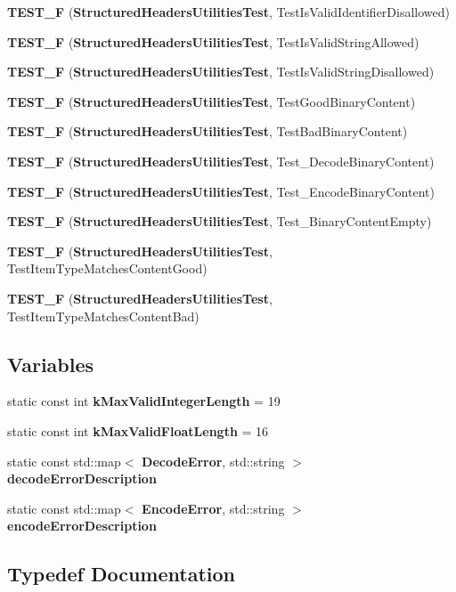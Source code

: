 \begin{DoxyCompactItemize}
\item 
{\bf T\+E\+S\+T\+\_\+F} ({\bf Structured\+Headers\+Utilities\+Test}, Test\+Is\+Valid\+Identifier\+Disallowed)
\item 
{\bf T\+E\+S\+T\+\_\+F} ({\bf Structured\+Headers\+Utilities\+Test}, Test\+Is\+Valid\+String\+Allowed)
\item 
{\bf T\+E\+S\+T\+\_\+F} ({\bf Structured\+Headers\+Utilities\+Test}, Test\+Is\+Valid\+String\+Disallowed)
\item 
{\bf T\+E\+S\+T\+\_\+F} ({\bf Structured\+Headers\+Utilities\+Test}, Test\+Good\+Binary\+Content)
\item 
{\bf T\+E\+S\+T\+\_\+F} ({\bf Structured\+Headers\+Utilities\+Test}, Test\+Bad\+Binary\+Content)
\item 
{\bf T\+E\+S\+T\+\_\+F} ({\bf Structured\+Headers\+Utilities\+Test}, Test\+\_\+\+Decode\+Binary\+Content)
\item 
{\bf T\+E\+S\+T\+\_\+F} ({\bf Structured\+Headers\+Utilities\+Test}, Test\+\_\+\+Encode\+Binary\+Content)
\item 
{\bf T\+E\+S\+T\+\_\+F} ({\bf Structured\+Headers\+Utilities\+Test}, Test\+\_\+\+Binary\+Content\+Empty)
\item 
{\bf T\+E\+S\+T\+\_\+F} ({\bf Structured\+Headers\+Utilities\+Test}, Test\+Item\+Type\+Matches\+Content\+Good)
\item 
{\bf T\+E\+S\+T\+\_\+F} ({\bf Structured\+Headers\+Utilities\+Test}, Test\+Item\+Type\+Matches\+Content\+Bad)
\end{DoxyCompactItemize}
\subsection*{Variables}
\begin{DoxyCompactItemize}
\item 
static const int {\bf k\+Max\+Valid\+Integer\+Length} = 19
\item 
static const int {\bf k\+Max\+Valid\+Float\+Length} = 16
\item 
static const std\+::map$<$ {\bf Decode\+Error}, std\+::string $>$ {\bf decode\+Error\+Description}
\item 
static const std\+::map$<$ {\bf Encode\+Error}, std\+::string $>$ {\bf encode\+Error\+Description}
\end{DoxyCompactItemize}


\subsection{Typedef Documentation}
